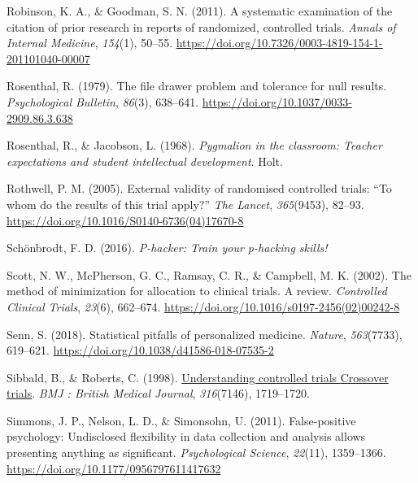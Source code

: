 \documentclass{krantz}
\newlength{\cslhangindent}
\newlength{\cslentryspacingunit} %
\newenvironment{CSLReferences}[2] %
{%
\setlength{\parindent}{0pt}
\ifodd #1
\let\oldpar\par
\def\par{\hangindent=\cslhangindent\oldpar}
\fi
\setlength{\parskip}{#2\cslentryspacingunit}
}%
{}
\begin{document}
\begin{CSLReferences}{1}{0}
\leavevmode{}%
Robinson, K. A., \& Goodman, S. N. (2011). A systematic examination of the citation of prior research in reports of randomized, controlled trials. \emph{Annals of Internal Medicine}, \emph{154}(1), 50--55. \url{https://doi.org/10.7326/0003-4819-154-1-201101040-00007}

\leavevmode{}%
Rosenthal, R. (1979). The file drawer problem and tolerance for null results. \emph{Psychological Bulletin}, \emph{86}(3), 638--641. \url{https://doi.org/10.1037/0033-2909.86.3.638}

\leavevmode{}%
Rosenthal, R., \& Jacobson, L. (1968). \emph{Pygmalion in the classroom: {Teacher} expectations and student intellectual development}. {Holt}.

\leavevmode{}%
Rothwell, P. M. (2005). External validity of randomised controlled trials: {``{To} whom do the results of this trial apply?''} \emph{The Lancet}, \emph{365}(9453), 82--93. \url{https://doi.org/10.1016/S0140-6736(04)17670-8}

\leavevmode{}%
Schönbrodt, F. D. (2016). \emph{P-hacker: {Train} your p-hacking skills!}

\leavevmode{}%
Scott, N. W., McPherson, G. C., Ramsay, C. R., \& Campbell, M. K. (2002). The method of minimization for allocation to clinical trials. A review. \emph{Controlled Clinical Trials}, \emph{23}(6), 662--674. \url{https://doi.org/10.1016/s0197-2456(02)00242-8}

\leavevmode{}%
Senn, S. (2018). Statistical pitfalls of personalized medicine. \emph{Nature}, \emph{563}(7733), 619--621. \url{https://doi.org/10.1038/d41586-018-07535-2}

\leavevmode{}%
Sibbald, B., \& Roberts, C. (1998). \href{https://www.ncbi.nlm.nih.gov/pmc/articles/PMC1113275}{Understanding controlled trials {Crossover} trials}. \emph{BMJ : British Medical Journal}, \emph{316}(7146), 1719--1720.

\leavevmode{}%
Simmons, J. P., Nelson, L. D., \& Simonsohn, U. (2011). False-positive psychology: {Undisclosed} flexibility in data collection and analysis allows presenting anything as significant. \emph{Psychological Science}, \emph{22}(11), 1359--1366. \url{https://doi.org/10.1177/0956797611417632}


\end{CSLReferences}
\end{document}
